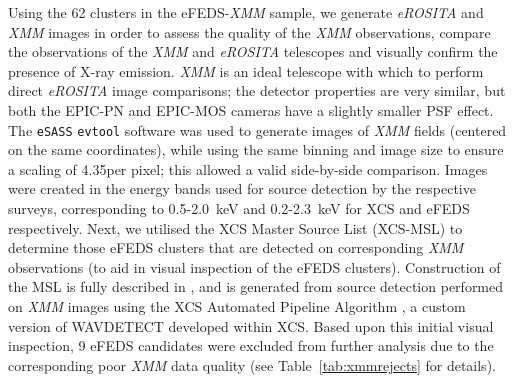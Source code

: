 \documentclass[fleqn,usenatbib]{mnras}
\begin{document}


Using the 62 clusters in the eFEDS-{\em XMM} sample, we generate {\em eROSITA} and {\em XMM} images in order to assess the quality of the {\em XMM} observations, compare the observations of the {\em XMM} and {\em eROSITA} telescopes and visually confirm the presence of X-ray emission.  {\em XMM} is an ideal telescope with which to perform direct {\em eROSITA} image comparisons; the detector properties are very similar, but both the EPIC-PN and EPIC-MOS cameras have a slightly smaller PSF effect.  The \texttt{eSASS} \texttt{evtool} software was used to generate images of {\em XMM} fields (centered on the same coordinates), while using the same binning and image size to ensure a scaling of 4.35\arcsec per pixel; this allowed a valid side-by-side comparison. Images were created in the energy bands used for source detection by the respective surveys, corresponding to 0.5-2.0~keV and 0.2-2.3~keV for XCS and eFEDS respectively.  Next, we utilised the XCS Master Source List (XCS-MSL) to determine those eFEDS clusters that are detected on corresponding {\em XMM} observations (to aid in visual inspection of the eFEDS clusters).  Construction of the MSL is fully described in \cite{xcsgiles}, and is generated from source detection performed on {\em XMM} images using the XCS Automated Pipeline Algorithm \citep[XAPA,][]{xcsmethod}, a custom version of WAVDETECT \citep{wavdetect} developed within XCS.  Based upon this initial visual inspection, 9 eFEDS candidates were excluded from further analysis due to the corresponding poor {\em XMM} data quality (see Table~\ref{tab:xmmrejects} for details).    
\end{document}
